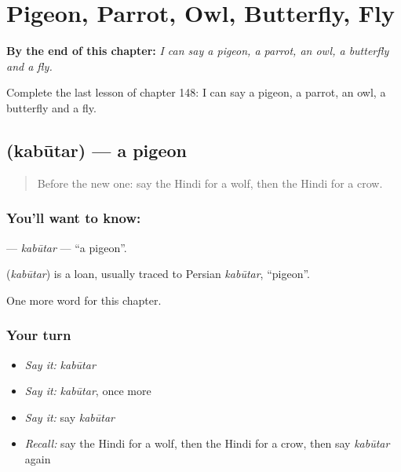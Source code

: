 
\chapter{Pigeon, Parrot, Owl, Butterfly, Fly}
\label{ch:hi-pigeon-parrot-owl-butterfly-fly}

\begin{chapteropening}
\textbf{By the end of this chapter:} \emph{I can say a pigeon, a parrot, an owl, a butterfly and a fly.}

Complete the last lesson of chapter 148: I can say a pigeon, a parrot, an owl, a butterfly and a fly.
\end{chapteropening}

\section[\texorpdfstring{\hi{कबूतर} (kabūtar)}{कबूतर (kabūtar)}]{ (kabūtar) — a pigeon}

\label{lesson:HI-C148-kabutar}



\begin{quote}
Before the new one: say the Hindi for a wolf, then the Hindi for a crow.
\end{quote}

\subsection*{You'll want to know: }
\textbf{} — \emph{kabūtar} — \textquotedblleft{}a pigeon\textquotedblright{}.

\begin{cousinweb}
\textbf{} (\emph{kabūtar}) is a loan, usually traced to Persian \emph{kabūtar}, \textquotedblleft{}pigeon\textquotedblright{}.
\end{cousinweb}

\begin{grammarlens}[title={What you've built}]
One more word for this chapter.
\end{grammarlens}

\subsection*{Your turn}
\begin{itemize}
\raggedright
  \item \emph{Say it:} \emph{kabūtar}
  \item \emph{Say it:} \emph{kabūtar}, once more
  \item \emph{Say it:} say \emph{kabūtar}
  \item \emph{Recall:} say the Hindi for a wolf, then the Hindi for a crow, then say \emph{kabūtar} again
\end{itemize}

